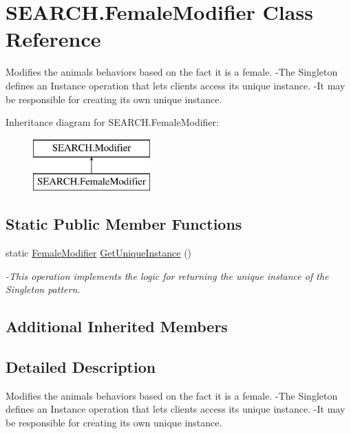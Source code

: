 \hypertarget{class_s_e_a_r_c_h_1_1_female_modifier}{\section{S\-E\-A\-R\-C\-H.\-Female\-Modifier Class Reference}
\label{class_s_e_a_r_c_h_1_1_female_modifier}
}


Modifies the animals behaviors based on the fact it is a female. -\/\-The Singleton defines an Instance operation that lets clients access its unique instance. -\/\-It may be responsible for creating its own unique instance.  


Inheritance diagram for S\-E\-A\-R\-C\-H.\-Female\-Modifier\-:\begin{figure}[H]
\begin{center}
\leavevmode
\includegraphics[height=2.000000cm]{class_s_e_a_r_c_h_1_1_female_modifier}
\end{center}
\end{figure}
\subsection*{Static Public Member Functions}
\begin{DoxyCompactItemize}
\item 
static \hyperlink{class_s_e_a_r_c_h_1_1_female_modifier}{Female\-Modifier} \hyperlink{class_s_e_a_r_c_h_1_1_female_modifier_a1fe761214840ce6676c4dacf425c6643}{Get\-Unique\-Instance} ()
\begin{DoxyCompactList}\small\item\em -\/\-This operation implements the logic for returning the unique instance of the Singleton pattern. \end{DoxyCompactList}\end{DoxyCompactItemize}
\subsection*{Additional Inherited Members}


\subsection{Detailed Description}
Modifies the animals behaviors based on the fact it is a female. -\/\-The Singleton defines an Instance operation that lets clients access its unique instance. -\/\-It may be responsible for creating its own unique instance. 



